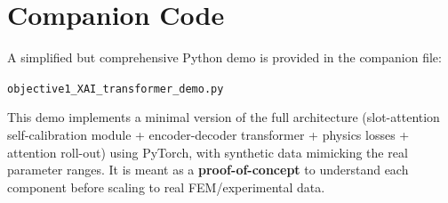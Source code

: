 \documentclass[11pt,a4paper]{article}
\begin{document}
\section{Companion Code}

A simplified but comprehensive Python demo is provided in the companion file:

\begin{center}
  \texttt{objective1\_XAI\_transformer\_demo.py}
\end{center}

This demo implements a minimal version of the full architecture (slot-attention
self-calibration module + encoder-decoder transformer + physics losses +
attention roll-out) using PyTorch, with synthetic data mimicking the real
parameter ranges. It is meant as a \textbf{proof-of-concept} to understand each
component before scaling to real FEM/experimental data.
\end{document}

